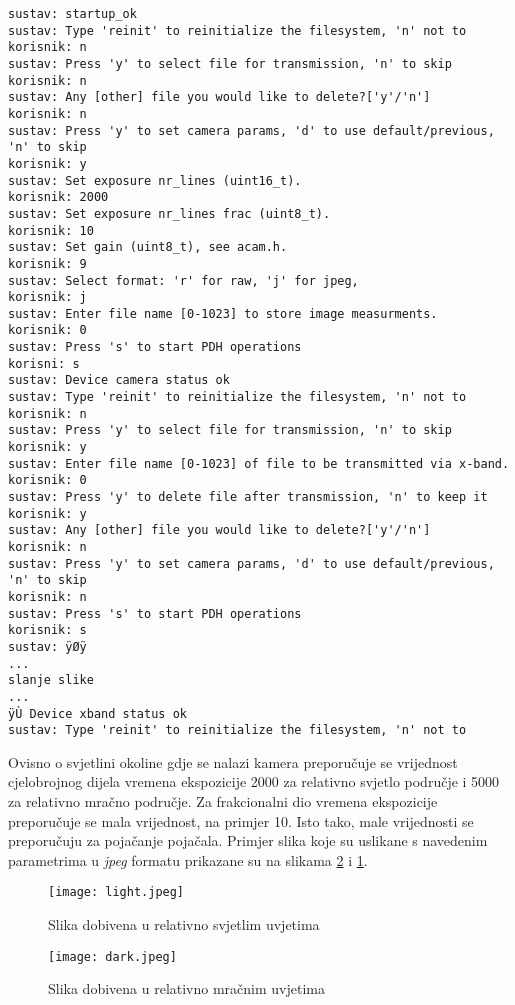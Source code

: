 \begin{lstlisting}[caption=Komunikacija između računala i PDH sustava, label={lst:default_comms}]
sustav: startup_ok
sustav: Type 'reinit' to reinitialize the filesystem, 'n' not to
korisnik: n
sustav: Press 'y' to select file for transmission, 'n' to skip
korisnik: n
sustav: Any [other] file you would like to delete?['y'/'n']
korisnik: n
sustav: Press 'y' to set camera params, 'd' to use default/previous, 'n' to skip
korisnik: y
sustav: Set exposure nr_lines (uint16_t).
korisnik: 2000
sustav: Set exposure nr_lines frac (uint8_t).
korisnik: 10
sustav: Set gain (uint8_t), see acam.h.
korisnik: 9
sustav: Select format: 'r' for raw, 'j' for jpeg,
korisnik: j
sustav: Enter file name [0-1023] to store image measurments.
korisnik: 0
sustav: Press 's' to start PDH operations
korisni: s
sustav: Device camera status ok
sustav: Type 'reinit' to reinitialize the filesystem, 'n' not to
korisnik: n
sustav: Press 'y' to select file for transmission, 'n' to skip
korisnik: y
sustav: Enter file name [0-1023] of file to be transmitted via x-band.
korisnik: 0
sustav: Press 'y' to delete file after transmission, 'n' to keep it
korisnik: y
sustav: Any [other] file you would like to delete?['y'/'n']
korisnik: n
sustav: Press 'y' to set camera params, 'd' to use default/previous, 'n' to skip
korisnik: n
sustav: Press 's' to start PDH operations
korisnik: s
sustav: ÿØÿ
...
slanje slike
...
ÿÙ Device xband status ok
sustav: Type 'reinit' to reinitialize the filesystem, 'n' not to
\end{lstlisting}

Ovisno o svjetlini okoline gdje se nalazi kamera preporučuje se vrijednost cjelobrojnog dijela vremena ekspozicije 2000 za relativno svjetlo područje i 5000 za relativno mračno područje. Za frakcionalni dio vremena ekspozicije preporučuje se mala vrijednost, na primjer 10. Isto tako, male vrijednosti se preporučuju za pojačanje pojačala. Primjer slika koje su uslikane s navedenim parametrima u \textit{jpeg} formatu prikazane su na slikama \ref{fig:dark} i \ref{fig:light}.
\begin{figure}[H]
	\centering
	\texttt{[image: light.jpeg]}
	\caption{Slika dobivena u relativno svjetlim uvjetima}
	\label{fig:light}
\end{figure}
\begin{figure}[H]
	\centering
	\texttt{[image: dark.jpeg]}
	\caption{Slika dobivena u relativno mračnim uvjetima}
	\label{fig:dark}
\end{figure}